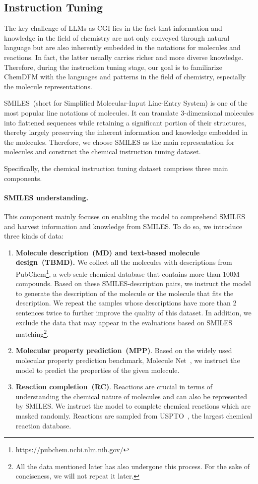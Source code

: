 \subsection{Instruction Tuning}\label{sec:instune}

The key challenge of LLMs as CGI lies in the fact that information and knowledge in the field of chemistry are not only conveyed through natural language but are also inherently embedded in the notations for molecules and reactions. In fact, the latter usually carries richer and more diverse knowledge.
Therefore, during the instruction tuning stage, our goal is to familiarize ChemDFM with the languages and patterns in the field of chemistry, especially the molecule representations.

SMILES~(short for Simplified Molecular-Input Line-Entry System) is one of the most popular line notations of molecules. It can translate 3-dimensional molecules into flattened sequences while retaining a significant portion of their structures, thereby largely preserving the inherent information and knowledge embedded in the molecules. Therefore, we choose SMILES as the main representation for molecules and construct the chemical instruction tuning dataset.

Specifically, the chemical instruction tuning dataset comprises three main components.
\paragraph{SMILES understanding.} This component mainly focuses on enabling the model to comprehend SMILES and harvest information and knowledge from SMILES. To do so, we introduce three kinds of data:
\begin{enumerate}
    \item \textbf{Molecule description~(MD) and text-based molecule design~(TBMD).} We collect all the molecules with descriptions from PubChem\footnote{\url{https://pubchem.ncbi.nlm.nih.gov/}}, a web-scale chemical database that contains more than 100M compounds.
    Based on these SMILES-description pairs, we instruct the model to generate the description of the molecule or the molecule that fits the description. We repeat the samples whose descriptions have more than 2 sentences twice to further improve the quality of this dataset. In addition, we exclude the data that may appear in the evaluations based on SMILES matching\footnote{All the data mentioned later has also undergone this process. For the sake of conciseness, we will not repeat it later.}.
    \item \textbf{Molecular property prediction~(MPP)}. Based on the widely used molecular property prediction benchmark, Molecule Net~\cite{wu2018moleculenet}, we instruct the model to predict the properties of the given molecule.
    \item \textbf{Reaction completion~(RC)}. Reactions are crucial in terms of understanding the chemical nature of molecules and can also be represented by SMILES. We instruct the model to complete chemical reactions which are masked randomly. Reactions are sampled from USPTO~\cite{lowe2012extraction}, the largest chemical reaction database.
\end{enumerate}


